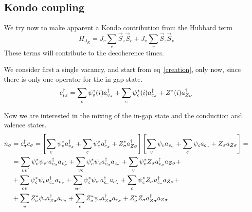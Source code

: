 \subsection{Kondo coupling}
We try now to make apparent a Kondo contribution from the Hubbard term
\begin{equation}
  H_{J_{K}} = J_c \sum_c \vec{S}_z \vec{S}_c + J_v \sum_v \vec{S}_z \vec{S}_v
\end{equation}
These terms will contribute to the decoherence times.

We consider first a single vacancy, and start from eq~\eqref{creation}, only now, since there is only one operator for the in-gap state.
\begin{equation}
  c^{\dagger}_{i\sigma} = \sum_v\psi^*_v(i)a^{\dagger}_{v_\sigma}+
                    \sum_c\psi^*_c(i)a^{\dagger}_{c_\sigma}+
                    Z^*(i)a^{\dagger}_{Z\sigma}
\end{equation}

Now we are interested in the mixing of the in-gap state and the conduction and valence states.
\begin{equation}
  \begin{split}
    n_\sigma &= c^{\dagger}_{\sigma}c_{\sigma} =
  \left[\sum_v\psi_v^*a^{\dagger}_{v_\sigma}+\sum_c\psi_c^*a^{\dagger}_{c_\sigma}+Z^*_\sigma a^{\dagger}_{Z\sigma}\right]
  \left[\sum_v\psi_va_{v_\sigma}+\sum_c\psi_ca_{c_\sigma}+Z_\sigma a_{Z\sigma}\right]=\\
  &=\sum_{vv'}\psi_v^*\psi_{v'}a^{\dagger}_{v_\sigma}a_{v'_\sigma}+
  \sum_{vc}\psi_v^*\psi_ca^{\dagger}_{v_\sigma}a_{c_\sigma}+
  \sum_v\psi_v^*Z_\sigma a^{\dagger}_{v_\sigma}a_{Z\sigma}+\\
  &+\sum_{cv}\psi_c^*\psi_va^{\dagger}_{c_\sigma}a_{v_\sigma}+
  \sum_{cc'}\psi_c^*\psi_{c'}a^{\dagger}_{c_\sigma}a_{c'_\sigma}+
  \sum_c\psi_c^*Z_\sigma a^{\dagger}_{c_\sigma}a_{Z\sigma}+\\
  &+\sum_v Z^*_\sigma\psi_va^{\dagger}_{Z\sigma}a_{v_\sigma}+
  \sum_cZ^*_\sigma\psi_ca^{\dagger}_{Z\sigma}a_{c_\sigma}+
  Z^*_\sigma Z_\sigma a^{\dagger}_{Z\sigma}a_{Z\sigma}
  \end{split}
\end{equation}

